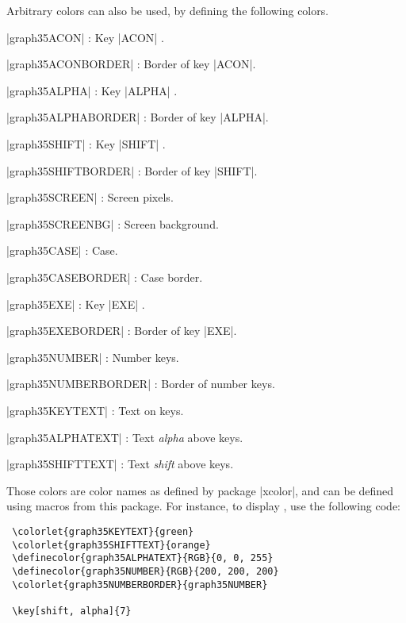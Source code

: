 \documentclass{ltxdoc}
\begin{document}
 Arbitrary colors can also be used, by defining the following colors.

 \begin{description}
   \item |graph35ACON| : Key |ACON| .
   \item |graph35ACONBORDER| : Border of key |ACON|.
   \item |graph35ALPHA| : Key |ALPHA| .
   \item |graph35ALPHABORDER| : Border of key |ALPHA|.
   \item |graph35SHIFT| : Key |SHIFT| .
   \item |graph35SHIFTBORDER| : Border of key |SHIFT|.
   \item |graph35SCREEN| : Screen pixels.
   \item |graph35SCREENBG| : Screen background.
   \item |graph35CASE| : Case.
   \item |graph35CASEBORDER| : Case border.
   \item |graph35EXE| : Key |EXE| .
   \item |graph35EXEBORDER| : Border of key |EXE|.
   \item |graph35NUMBER| : Number keys.
   \item |graph35NUMBERBORDER| : Border of number keys.
   \item |graph35KEYTEXT| : Text on keys.
   \item |graph35ALPHATEXT| : Text \emph{alpha} above keys.
   \item |graph35SHIFTTEXT| : Text \emph{shift} above keys.
 \end{description}


 Those colors are color names as defined by package |xcolor|, and can be defined using macros from this package. For instance, to display , use the following code:

 \begin{lstlisting}
 \colorlet{graph35KEYTEXT}{green}
 \colorlet{graph35SHIFTTEXT}{orange}
 \definecolor{graph35ALPHATEXT}{RGB}{0, 0, 255}
 \definecolor{graph35NUMBER}{RGB}{200, 200, 200}
 \colorlet{graph35NUMBERBORDER}{graph35NUMBER}
 
 \key[shift, alpha]{7}
 \end{lstlisting}
\end{document}
